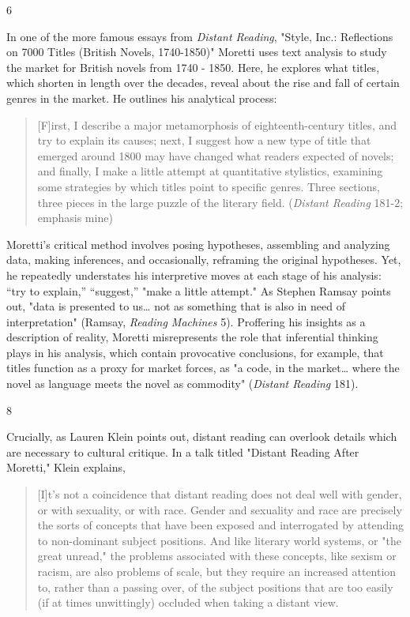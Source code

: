 \documentclass[11pt]{article}
\begin{document}
6

In one of the more famous essays from \emph{Distant Reading}, "Style, Inc.:
Reflections on 7000 Titles (British Novels, 1740-1850)" Moretti uses
text analysis to study the market for British novels from 1740 - 1850.
Here, he explores what titles, which shorten in length over the
decades, reveal about the rise and fall of certain genres in the
market. He outlines his analytical process:
\begin{quote}
[F]irst, I describe a major metamorphosis of eighteenth-century
titles, and try to explain its causes; next, I suggest how a new type
of title that emerged around 1800 may have changed what readers
expected of novels; and finally, I make a little attempt at
quantitative stylistics, examining some strategies by which titles
point to specific genres. Three sections, three pieces in the large
puzzle of the literary field. (\emph{Distant Reading} 181-2; emphasis mine)
\end{quote}
Moretti's critical method involves posing hypotheses, assembling and
analyzing data, making inferences, and occasionally, reframing the
original hypotheses. Yet, he repeatedly understates his interpretive
moves at each stage of his analysis: “try to explain,” “suggest,”
"make a little attempt." As Stephen Ramsay points out, "data is
presented to us\ldots{} not as something that is also in need of
interpretation" (Ramsay, \emph{Reading Machines} 5). Proffering his
insights as a description of reality, Moretti misrepresents the role
that inferential thinking plays in his analysis, which contain
provocative conclusions, for example, that titles function as a proxy
for market forces, as "a code, in the market\ldots{} where the novel as
language meets the novel as commodity" (\emph{Distant Reading} 181).

8

Crucially, as Lauren Klein points out, distant reading can overlook
details which are necessary to cultural critique. In a talk titled
"Distant Reading After Moretti," Klein explains,
\begin{quote}
[I]t’s not a coincidence that distant reading does not deal well with
gender, or with sexuality, or with race. Gender and sexuality and race
are precisely the sorts of concepts that have been exposed and
interrogated by attending to non-dominant subject positions. And like
literary world systems, or "the great unread," the problems associated
with these concepts, like sexism or racism, are also problems of
scale, but they require an increased attention to, rather than a
passing over, of the subject positions that are too easily (if at
times unwittingly) occluded when taking a distant view.
\end{quote}
\end{document}
